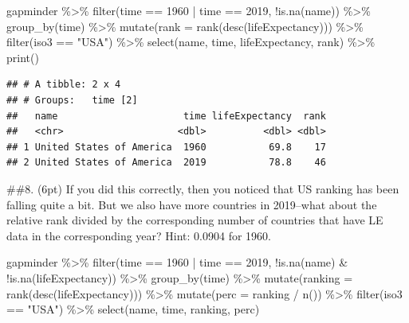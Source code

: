 \documentclass[
]{article}
\newenvironment{Shaded}{\begin{snugshade}}{\end{snugshade}}
\newcommand{\AttributeTok}[1]{\textcolor[rgb]{0.77,0.63,0.00}{#1}}
\newcommand{\DecValTok}[1]{\textcolor[rgb]{0.00,0.00,0.81}{#1}}
\newcommand{\FunctionTok}[1]{\textcolor[rgb]{0.00,0.00,0.00}{#1}}
\newcommand{\NormalTok}[1]{#1}
\newcommand{\SpecialCharTok}[1]{\textcolor[rgb]{0.00,0.00,0.00}{#1}}
\newcommand{\StringTok}[1]{\textcolor[rgb]{0.31,0.60,0.02}{#1}}
\begin{document}
\begin{Shaded}
\begin{Highlighting}[]
\NormalTok{gapminder }\SpecialCharTok{\%\textgreater{}\%}
  \FunctionTok{filter}\NormalTok{(time }\SpecialCharTok{==} \DecValTok{1960} \SpecialCharTok{|}\NormalTok{ time }\SpecialCharTok{==} \DecValTok{2019}\NormalTok{,}
         \SpecialCharTok{!}\FunctionTok{is.na}\NormalTok{(name)) }\SpecialCharTok{\%\textgreater{}\%}
  \FunctionTok{group\_by}\NormalTok{(time) }\SpecialCharTok{\%\textgreater{}\%}
  \FunctionTok{mutate}\NormalTok{(}\AttributeTok{rank =} \FunctionTok{rank}\NormalTok{(}\FunctionTok{desc}\NormalTok{(lifeExpectancy))) }\SpecialCharTok{\%\textgreater{}\%}
  \FunctionTok{filter}\NormalTok{(iso3 }\SpecialCharTok{==} \StringTok{"USA"}\NormalTok{) }\SpecialCharTok{\%\textgreater{}\%}
  \FunctionTok{select}\NormalTok{(name, time, lifeExpectancy, rank) }\SpecialCharTok{\%\textgreater{}\%}
  \FunctionTok{print}\NormalTok{()}
\end{Highlighting}
\end{Shaded}

\begin{verbatim}
## # A tibble: 2 x 4
## # Groups:   time [2]
##   name                      time lifeExpectancy  rank
##   <chr>                    <dbl>          <dbl> <dbl>
## 1 United States of America  1960           69.8    17
## 2 United States of America  2019           78.8    46
\end{verbatim}

\#\#8. (6pt) If you did this correctly, then you noticed that US ranking
has been falling quite a bit. But we also have more countries in
2019--what about the relative rank divided by the corresponding number
of countries that have LE data in the corresponding year? Hint: 0.0904
for 1960.

\begin{Shaded}
\begin{Highlighting}[]
\NormalTok{gapminder }\SpecialCharTok{\%\textgreater{}\%}
  \FunctionTok{filter}\NormalTok{(time }\SpecialCharTok{==} \DecValTok{1960} \SpecialCharTok{|}\NormalTok{ time }\SpecialCharTok{==} \DecValTok{2019}\NormalTok{,}
         \SpecialCharTok{!}\FunctionTok{is.na}\NormalTok{(name) }\SpecialCharTok{\&} \SpecialCharTok{!}\FunctionTok{is.na}\NormalTok{(lifeExpectancy)) }\SpecialCharTok{\%\textgreater{}\%}
  \FunctionTok{group\_by}\NormalTok{(time) }\SpecialCharTok{\%\textgreater{}\%}
  \FunctionTok{mutate}\NormalTok{(}\AttributeTok{ranking =} \FunctionTok{rank}\NormalTok{(}\FunctionTok{desc}\NormalTok{(lifeExpectancy))) }\SpecialCharTok{\%\textgreater{}\%}
  \FunctionTok{mutate}\NormalTok{(}\AttributeTok{perc =}\NormalTok{ ranking }\SpecialCharTok{/} \FunctionTok{n}\NormalTok{()) }\SpecialCharTok{\%\textgreater{}\%}
  \FunctionTok{filter}\NormalTok{(iso3 }\SpecialCharTok{==} \StringTok{"USA"}\NormalTok{) }\SpecialCharTok{\%\textgreater{}\%}
  \FunctionTok{select}\NormalTok{(name, time, ranking, perc) }
\end{Highlighting}
\end{Shaded}
\end{document}
